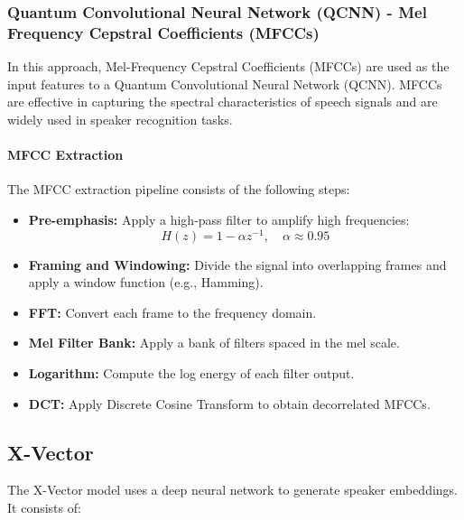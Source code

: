 \documentclass[conference]{IEEEtran}
\begin{document}
\subsubsection{Quantum Convolutional Neural Network (QCNN) - Mel Frequency Cepstral
    Coefficients (MFCCs)}

In this approach, Mel-Frequency Cepstral Coefficients (MFCCs) are used as the input
features to a Quantum Convolutional Neural Network (QCNN). MFCCs are effective in
capturing the spectral characteristics of speech signals and are widely used in
speaker recognition tasks.

\paragraph{MFCC Extraction}

The MFCC extraction pipeline consists of the following steps:

\begin{itemize}
    \item \textbf{Pre-emphasis:} Apply a high-pass filter to amplify high frequencies:
          \[
              H(z) = 1 - \alpha z^{-1}, \quad \alpha \approx 0.95
          \]
    \item \textbf{Framing and Windowing:} Divide the signal into overlapping frames
          and apply a window function (e.g., Hamming).
    \item \textbf{FFT:} Convert each frame to the frequency domain.
    \item \textbf{Mel Filter Bank:} Apply a bank of filters spaced in the mel scale.
    \item \textbf{Logarithm:} Compute the log energy of each filter output.
    \item \textbf{DCT:} Apply Discrete Cosine Transform to obtain decorrelated MFCCs.
\end{itemize}


















\subsection{X-Vector}

The X-Vector model uses a deep neural network to generate speaker embeddings. It consists of:
\end{document}
